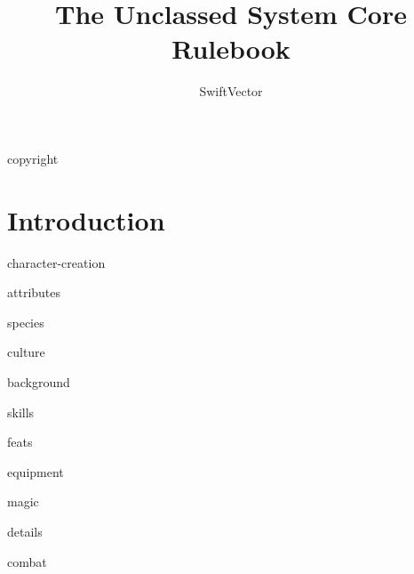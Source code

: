 \documentclass[9pt]{extbook}
\title{The Unclassed System Core Rulebook}
\author{SwiftVector}
\begin{document}
\maketitle

\frontmatter

{copyright}

\tableofcontents

\mainmatter
\chapter{Introduction}


{character-creation}

{attributes}

{species}

{culture}

{background}

{skills}

{feats}

{equipment}

{magic}

{details}

{combat}


\backmatter

\printindex

\glsaddallunused
\printglossary[type=\acronymtype]
\printglossary
\end{document}
